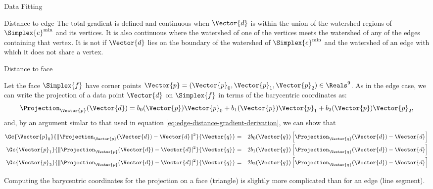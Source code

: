 \begin{plSection}{Data Fitting}
\begin{plSection}{Distance to edge}
The total gradient is defined and continuous
when $\Vector{d}$ is within the union of the watershed regions
of $\Simplex{e}^{\min}$ and its vertices.
It is also continuous where the watershed of one of the vertices
meets the watershed of any of the edges containing that vertex.
It is not if $\Vector{d}$ lies on the boundary of the
watershed of $\Simplex{e}^{\min}$ and the watershed of an
edge with which it does not share a vertex.

\end{plSection}%
\begin{plSection}{Distance to face}
\label{sec:Distance-to-face}

Let the face $\Simplex{f}$ have corner points $\Vector{p} = (\Vector{p}_0, \Vector{p}_1, \Vector{p}_2) \in \Reals^9$.
As in the edge case,
we can write the projection of a data point $\Vector{d}$ on $\Simplex{f}$
in terms of the barycentric coordinates as:
\begin{equation}
\Projection_\Vector{p} (\Vector{d}) = b_0(\Vector{p}) \Vector{p}_0 + b_1(\Vector{p}) \Vector{p}_1 + b_2(\Vector{p}) \Vector{p}_2,
\end{equation}
and, by an argument simlar to that used in
equation \ref{eq:edge-distance-gradient-derivation},
we can show that
\begin{eqnarray}
\label{eq:face-distance-gradient}
\Gc{\Vector{p}_0}{ \| \Projection_{\Vector{p}} (\Vector{d}) - \Vector{d} \|^2 }{\Vector{q}}
& = & 2 b_0(\Vector{q}) \left[ \Projection_{\Vector{q}} (\Vector{d}) - \Vector{d} \right]
\\
\Gc{\Vector{p}_1}{ \| \Projection_{\Vector{p}} (\Vector{d}) - \Vector{d}|^2 }{\Vector{q}}
& = & 2 b_1(\Vector{q}) \left[ \Projection_\Vector{q} (\Vector{d}) - \Vector{d} \right]
\nonumber
\\
\Gc{\Vector{p}_2}{ \| \Projection_{\Vector{p}} (\Vector{d}) - \Vector{d}|^2 }{\Vector{q}}
& = & 2 b_2(\Vector{q}) \left[ \Projection_\Vector{q} (\Vector{d}) - \Vector{d} \right]
\nonumber
\end{eqnarray}

Computing the barycentric coordinates for the projection
on a face (triangle) is slightly more complicated than
for an edge (line segment).


\end{plSection}
\end{plSection}
